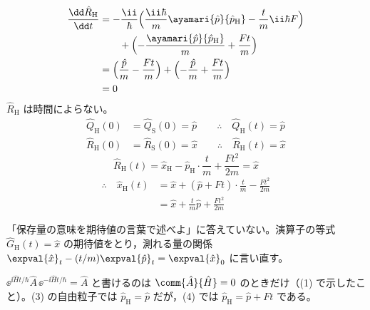\begin{align*}
\frac{\dd\hat{R}_{\mathrm{H}}}{\dd t}&=-\frac{\ii}{\hbar}\Bigl(\frac{\ii\hbar}{m}\ayamari{\hat{p}}{\hat{p}_{\mathrm{H}}}-\frac{t}{m}\ii\hbar F\Bigr)\\
&\qquad+\Bigl(-\frac{\ayamari{\hat{p}}{\hat{p}_{\mathrm{H}}}}{m}+\frac{Ft}{m}\Bigr)\\
&=\Bigl(\frac{\hat{p}}{m}-\frac{Ft}{m}\Bigr)+\Bigl(-\frac{\hat{p}}{m}+\frac{Ft}{m}\Bigr)\\
&=0
\end{align*}
$\hat{R}_{\mathrm{H}}$ は時間によらない。
\begin{align*}
\hat{Q}_{\mathrm{H}}(0)&=\hat{Q}_{\mathrm{S}}(0)=\hat{p}\qquad\therefore\quad\hat{Q}_{\mathrm{H}}(t)=\hat{p}\\
\hat{R}_{\mathrm{H}}(0)&=\hat{R}_{\mathrm{S}}(0)=\hat{x}\qquad\therefore\quad\hat{R}_{\mathrm{H}}(t)=\hat{x}
\end{align*}
\[ \hat{R}_{\mathrm{H}}(t)=\hat{x}_{\mathrm{H}}-\hat{p}_{\mathrm{H}}\cdot\frac{t}{m}+\frac{Ft^{2}}{2m}=\hat{x} \]
\begin{align*}
\therefore\quad\hat{x}_{\mathrm{H}}(t)&=\hat{x}+(\hat{p}+Ft)\cdot\frac{t}{m}-\frac{Ft^{2}}{2m}\\
&=\hat{x}+\frac{t}{m}\hat{p}+\frac{Ft^{2}}{2m}
\end{align*}
\item {} 「保存量の意味を期待値の言葉で述べよ」に答えていない。演算子の等式 $\hat{G}_{\mathrm{H}}(t)=\hat{x}$ の期待値をとり，測れる量の関係 $\expval{\hat{x}}_{t}-(t/m)\expval{\hat{p}}_{t}=\expval{\hat{x}}_{0}$ に言い直す。
\item $\ee^{\ii\hat{H}t/\hbar}\hat{A}\,\ee^{-\ii\hat{H}t/\hbar}=\hat{A}$ と書けるのは $\comm{\hat{A}}{\hat{H}}=0$ のときだけ（(1) で示したこと）。(3) の自由粒子では $\hat{p}_{\mathrm{H}}=\hat{p}$ だが，(4) では $\hat{p}_{\mathrm{H}}=\hat{p}+Ft$ である。
